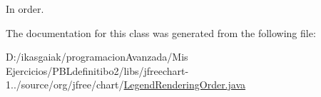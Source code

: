 In order. 

The documentation for this class was generated from the following file\+:\begin{DoxyCompactItemize}
\item 
D\+:/ikasgaiak/programacion\+Avanzada/\+Mis Ejercicios/\+P\+B\+Ldefinitibo2/libs/jfreechart-\/1../source/org/jfree/chart/\mbox{\hyperlink{_legend_rendering_order_8java}{Legend\+Rendering\+Order.\+java}}\end{DoxyCompactItemize}
